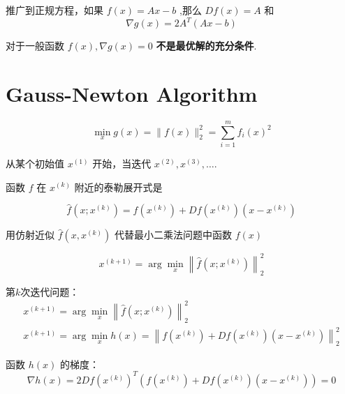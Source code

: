 \begin{corollary}[正规方程的最优必要条件]
    推广到正规方程，如果 $ f(x)=A x-b $ ,那么 $ D f(x)=A $ 和
\begin{equation}
\nabla g(x)=2 A^{T}(A x-b)
\end{equation}
\end{corollary}

\begin{remark}
    对于一般函数 $ f(x), \nabla g(x)=0 $ \textbf{不是最优解的充分条件}.
\end{remark}



\section{Gauss-Newton Algorithm}

\begin{problem}
    \begin{equation}
\min _{x} g(x)=\|f(x)\|_{2}^{2}=\sum_{i=1}^{m} f_{i}(x)^{2}
\end{equation}

从某个初始值 $ x^{(1)} $ 开始，当迭代 $ x^{(2)}, x^{(3)}, \ldots $.
\end{problem}

函数 $ f $ 在 $ x^{(k)} $ 附近的泰勒展开式是

\begin{equation}
\hat{f}\left(x ; x^{(k)}\right)=f\left(x^{(k)}\right)+D f\left(x^{(k)}\right)\left(x-x^{(k)}\right)
\end{equation}

用仿射近似 $ \hat{f}\left(x, x^{(k)}\right) $ 代替最小二乘法问题中函数 $ f(x) $

\begin{equation}
x^{(k+1)}=\arg \min _{x}\left\|\hat{f}\left(x ; x^{(k)}\right)\right\|_{2}^{2}
\end{equation}

第$k$次迭代问题：
\begin{equation}
\begin{array}{c}
x^{(k+1)}=\arg \min _{x}\left\|\hat{f}\left(x ; x^{(k)}\right)\right\|_{2}^{2} \\
x^{(k+1)}=\arg \min _{x} h(x)=\left\|f\left(x^{(k)}\right)+D f\left(x^{(k)}\right)\left(x-x^{(k)}\right)\right\|_{2}^{2}
\end{array}
\end{equation}

函数 $ h(x) $ 的梯度：
\begin{equation}
\nabla h(x)=2 D f\left(x^{(k)}\right)^{T}\left(f\left(x^{(k)}\right)+D f\left(x^{(k)}\right)\left(x-x^{(k)}\right)\right)=0
\end{equation}

